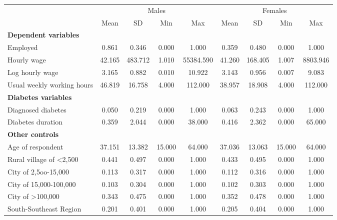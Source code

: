\documentclass[12pt,english,british]{article}
\newcommand{\sym}[1]{\ensuremath{^{#1}}} %
\begin{document}
\begin{table}[h]
\begin{center}
\begin{adjustbox}{max width=\textwidth}
{ \def\sym#1{\ifmmode^{#1}\else\(^{#1}\)\fi} \begin{tabular}{l*{2}{cccc}}
\toprule
                    &\multicolumn{4}{c}{Males}                          &\multicolumn{4}{c}{Females}                        \\
                    &        Mean&          SD&         Min&         Max&        Mean&          SD&         Min&         Max\\
\midrule
\textbf{Dependent variables} &&&&&&&& \\
Employed            &       0.861&       0.346&       0.000&       1.000&       0.359&       0.480&       0.000&       1.000\\
Hourly wage             &      42.165&     483.712&       1.010&   55384.590&      41.260&     168.405&       1.007&    8803.946\\
Log hourly wage     &       3.165&       0.882&       0.010&      10.922&       3.143&       0.956&       0.007&       9.083\\
Usual weekly working hours&      46.819&      16.758&       4.000&     112.000&      38.957&      18.908&       4.000&     112.000\\
\textbf{Diabetes variables} &&&&&&&& \\
Diagnosed diabetes  &       0.050&       0.219&       0.000&       1.000&       0.063&       0.243&       0.000&       1.000\\
Diabetes duration   &       0.359&       2.044&       0.000&      38.000&       0.416&       2.362&       0.000&      65.000\\
\textbf{Other controls} &&&&&&&& \\
Age of respondent   &      37.151&      13.382&      15.000&      64.000&      37.036&      13.063&      15.000&      64.000\\
Rural village of <2,500&       0.441&       0.497&       0.000&       1.000&       0.433&       0.495&       0.000&       1.000\\
City of 2,5oo-15,000&       0.113&       0.317&       0.000&       1.000&       0.112&       0.316&       0.000&       1.000\\
City of 15,000-100,000&       0.103&       0.304&       0.000&       1.000&       0.102&       0.303&       0.000&       1.000\\
City of >100,000    &       0.343&       0.475&       0.000&       1.000&       0.352&       0.478&       0.000&       1.000\\
South-Southeast Region&       0.201&       0.401&       0.000&       1.000&       0.205&       0.404&       0.000&       1.000\\

\end{tabular}}
\end{adjustbox}
\end{center}
\end{table}
\end{document}

